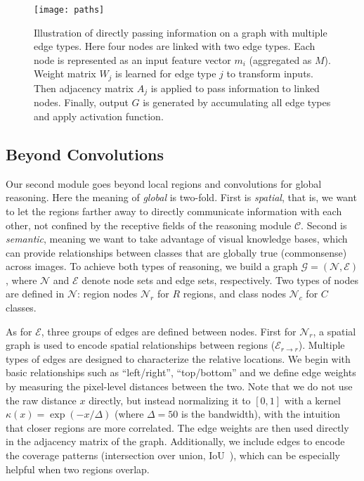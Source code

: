\documentclass[10pt,twocolumn,letterpaper]{article}
\begin{document}
\begin{figure}[t]
\centering
\texttt{[image: paths]}
\caption{{\small Illustration of directly passing information on a graph with multiple edge types. Here four nodes are linked with two edge types. Each node is represented as an input feature vector $m_i$ (aggregated as $M$). Weight matrix $W_j$ is learned for edge type $j$ to transform inputs. Then adjacency matrix $A_j$ is applied to pass information to linked nodes. Finally, output $G$ is generated by accumulating all edge types and apply activation function.}\label{fig:paths}}
\vspace{-0.2in}
\end{figure}

\subsection{Beyond Convolutions\label{beyond}}
Our second module goes beyond local regions and convolutions for global reasoning. Here the meaning of \emph{global} is two-fold. First is \emph{spatial}, that is, we want to let the regions farther away to directly communicate information with each other, not confined by the receptive fields of the reasoning module $\mathcal{C}$. Second is \emph{semantic}, meaning we want to take advantage of visual knowledge bases, which can provide relationships between classes that are globally true (\ie commonsense) across images. To achieve both types of reasoning, we build a graph $\mathcal{G}=(\mathcal{N}, \mathcal{E})$, where $\mathcal{N}$ and $\mathcal{E}$ denote node sets and edge sets, respectively. Two types of nodes are defined in $\mathcal{N}$: region nodes $\mathcal{N}_r$ for $R$ regions, and class nodes $\mathcal{N}_c$ for $C$ classes.  

As for $\mathcal{E}$, three groups of edges are defined between nodes. First for $\mathcal{N}_r$, a spatial graph is used to encode spatial relationships between regions ($\mathcal{E}_{r{\rightarrow}r}$). Multiple types of edges are designed to characterize the relative locations. We begin with basic relationships such as ``left/right'', ``top/bottom'' and we define edge weights by measuring the pixel-level distances between the two. Note that we do not use the raw distance $x$ directly, but instead normalizing it to $[0,1]$ with a kernel $\kappa(x){=}\exp(-x/\Delta)$ (where $\Delta{=}50$ is the bandwidth), with the intuition that closer regions are more correlated. The edge weights are then used directly in the adjacency matrix of the graph. Additionally, we include edges to encode the coverage patterns (\eg intersection over union, IoU~\cite{everingham2010pascal}), which can be especially helpful when two regions overlap. 
\end{document}
